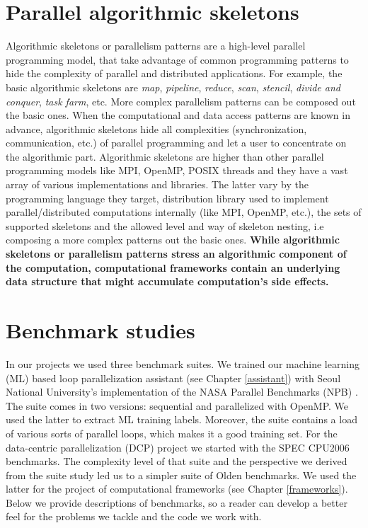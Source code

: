 \section{Parallel algorithmic skeletons}
\label{backgrnd_skeletons}
\quad Algorithmic skeletons or parallelism patterns \cite{mccool-patterns} are a high-level parallel programming model, that take advantage of common programming patterns to hide the complexity of parallel and distributed applications. For example, the basic algorithmic skeletons are \textit{map}, \textit{pipeline}, \textit{reduce}, \textit{scan}, \textit{stencil}, \textit{divide and conquer}, \textit{task farm}, etc. More complex parallelism patterns can be composed out the basic ones. When the computational and data access patterns are known in advance, algorithmic skeletons hide all complexities (synchronization, communication, etc.) of parallel programming and let a user to concentrate on the algorithmic part. Algorithmic skeletons are higher than other parallel programming models like MPI, OpenMP, POSIX threads and they have a vast array of various implementations and libraries. The latter vary by the programming language they target, distribution library used to implement parallel/distributed computations internally (like MPI, OpenMP, etc.), the sets of supported skeletons and the allowed level and way of skeleton nesting, i.e composing a more complex patterns out the basic ones.\newline\null
\textbf{\quad While algorithmic skeletons or parallelism patterns stress an algorithmic component of the computation, computational frameworks contain an underlying data structure that might accumulate computation's side effects.}
\section{Benchmark studies}
\label{backgrnd_benchmarks}
\quad In our projects we used three benchmark suites. We trained our machine learning (ML) based loop parallelization assistant \cite{assistant-aiseps} (see Chapter \ref{assistant}) with Seoul National University's implementation \cite{snu-npb-benchmarks} of the NASA Parallel Benchmarks (NPB) \cite{snu-npb-benchmarks}. The suite comes in two versions: sequential and parallelized with OpenMP. We used the latter to extract ML training labels. Moreover, the suite contains a load of various sorts of parallel loops, which makes it a good training set. For the data-centric parallelization (DCP) project we started with the SPEC CPU2006 benchmarks. The complexity level of that suite and the perspective we derived from the suite study led us to a simpler suite of Olden benchmarks. We used the latter for the project of computational frameworks (see Chapter \ref{frameworks}). Below we provide descriptions of benchmarks, so a reader can develop a better feel for the problems we tackle and the code we work with.
